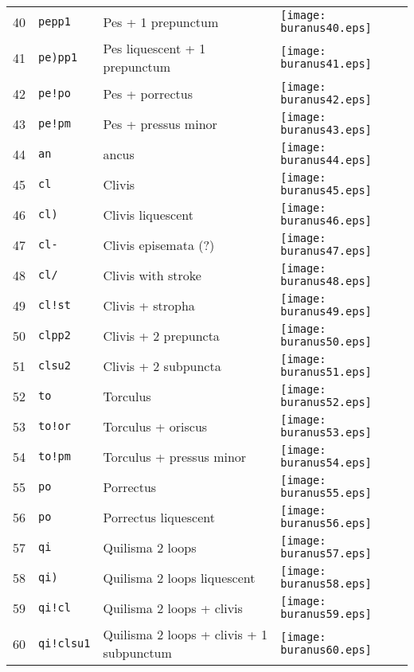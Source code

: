 \documentclass{scrarticle}
\begin{document}
\begin{longtable}{l|l|l|l}
40 & \texttt{pepp1} & Pes + 1 prepunctum & \texttt{[image: buranus40.eps]} \\
41 & \texttt{pe)pp1} & Pes liquescent + 1 prepunctum & \texttt{[image: buranus41.eps]} \\
42 & \texttt{pe!po} & Pes + porrectus & \texttt{[image: buranus42.eps]} \\
43 & \texttt{pe!pm} & Pes + pressus minor & \texttt{[image: buranus43.eps]} \\
44 & \texttt{an} & ancus & \texttt{[image: buranus44.eps]} \\
45 & \texttt{cl} & Clivis & \texttt{[image: buranus45.eps]} \\
46 & \texttt{cl)} & Clivis liquescent & \texttt{[image: buranus46.eps]} \\
47 & \texttt{cl-} & Clivis episemata (?) & \texttt{[image: buranus47.eps]} \\
48 & \texttt{cl/} & Clivis with stroke & \texttt{[image: buranus48.eps]} \\
49 & \texttt{cl!st} & Clivis + stropha & \texttt{[image: buranus49.eps]} \\
50 & \texttt{clpp2} & Clivis + 2 prepuncta & \texttt{[image: buranus50.eps]} \\
51 & \texttt{clsu2} & Clivis + 2 subpuncta & \texttt{[image: buranus51.eps]} \\
52 & \texttt{to} & Torculus & \texttt{[image: buranus52.eps]} \\
53 & \texttt{to!or} & Torculus + oriscus & \texttt{[image: buranus53.eps]} \\
54 & \texttt{to!pm} & Torculus + pressus minor & \texttt{[image: buranus54.eps]} \\
55 & \texttt{po} & Porrectus & \texttt{[image: buranus55.eps]} \\
56 & \texttt{po} & Porrectus liquescent & \texttt{[image: buranus56.eps]} \\
57 & \texttt{qi} & Quilisma 2 loops & \texttt{[image: buranus57.eps]} \\
58 & \texttt{qi)} & Quilisma 2 loops liquescent & \texttt{[image: buranus58.eps]} \\
59 & \texttt{qi!cl} & Quilisma 2 loops + clivis & \texttt{[image: buranus59.eps]} \\
60 & \texttt{qi!clsu1} & Quilisma 2 loops + clivis + 1 subpunctum & \texttt{[image: buranus60.eps]} \\

\end{longtable}
\end{document}
